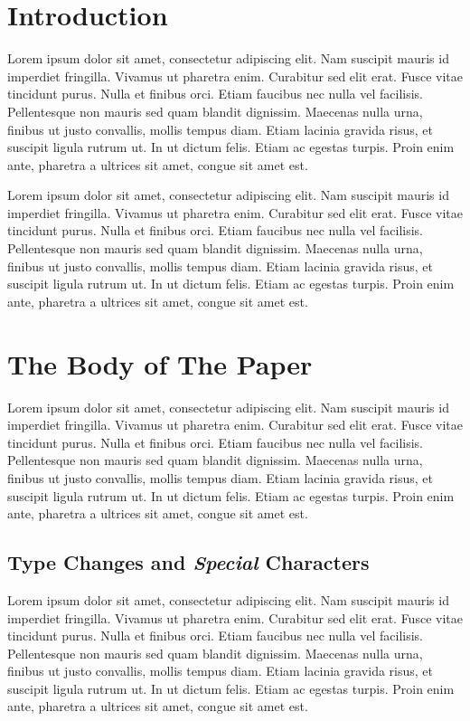 \section{Introduction}

Lorem ipsum dolor sit amet, consectetur adipiscing elit. Nam suscipit mauris id imperdiet fringilla. Vivamus ut pharetra enim. Curabitur sed elit erat. Fusce vitae tincidunt purus. Nulla et finibus orci. Etiam faucibus nec nulla vel facilisis. Pellentesque non mauris sed quam blandit dignissim. Maecenas nulla urna, finibus ut justo convallis, mollis tempus diam. Etiam lacinia gravida risus, et suscipit ligula rutrum ut. In ut dictum felis. Etiam ac egestas turpis. Proin enim ante, pharetra a ultrices sit amet, congue sit amet est.

Lorem ipsum dolor sit amet, consectetur adipiscing elit. Nam suscipit mauris id imperdiet fringilla. Vivamus ut pharetra enim. Curabitur sed elit erat. Fusce vitae tincidunt purus. Nulla et finibus orci. Etiam faucibus nec nulla vel facilisis. Pellentesque non mauris sed quam blandit dignissim. Maecenas nulla urna, finibus ut justo convallis, mollis tempus diam. Etiam lacinia gravida risus, et suscipit ligula rutrum ut. In ut dictum felis. Etiam ac egestas turpis. Proin enim ante, pharetra a ultrices sit amet, congue sit amet est.

\section{The Body of The Paper}

Lorem ipsum dolor sit amet, consectetur adipiscing elit. Nam suscipit mauris id imperdiet fringilla. Vivamus ut pharetra enim. Curabitur sed elit erat. Fusce vitae tincidunt purus. Nulla et finibus orci. Etiam faucibus nec nulla vel facilisis. Pellentesque non mauris sed quam blandit dignissim. Maecenas nulla urna, finibus ut justo convallis, mollis tempus diam. Etiam lacinia gravida risus, et suscipit ligula rutrum ut. In ut dictum felis. Etiam ac egestas turpis. Proin enim ante, pharetra a ultrices sit amet, congue sit amet est.

\subsection{Type Changes and {\itshape Special} Characters}

Lorem ipsum dolor sit amet, consectetur adipiscing elit. Nam suscipit mauris id imperdiet fringilla. Vivamus ut pharetra enim. Curabitur sed elit erat. Fusce vitae tincidunt purus. Nulla et finibus orci. Etiam faucibus nec nulla vel facilisis. Pellentesque non mauris sed quam blandit dignissim. Maecenas nulla urna, finibus ut justo convallis, mollis tempus diam. Etiam lacinia gravida risus, et suscipit ligula rutrum ut. In ut dictum felis. Etiam ac egestas turpis. Proin enim ante, pharetra a ultrices sit amet, congue sit amet est.


